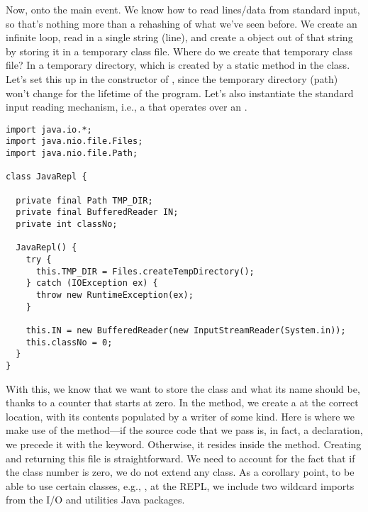 Now, onto the main event. We know how to read lines/data from standard input, so that's nothing more than a rehashing of what we've seen before. We create an infinite loop, read in a single string (line), and create a  object out of that string by storing it in a temporary class file. Where do we create that temporary class file? In a temporary directory, which is created by a static method in the class. Let's set this up in the constructor of , since the temporary directory (path) won't change for the lifetime of the program. Let's also instantiate the standard input reading mechanism, i.e., a  that operates over an .

\begin{lstlisting}[language=MyJava]
import java.io.*;
import java.nio.file.Files;
import java.nio.file.Path;

class JavaRepl {

  private final Path TMP_DIR;
  private final BufferedReader IN; 
  private int classNo;

  JavaRepl() {
    try {
      this.TMP_DIR = Files.createTempDirectory();
    } catch (IOException ex) {
      throw new RuntimeException(ex);
    } 
    
    this.IN = new BufferedReader(new InputStreamReader(System.in));
    this.classNo = 0;
  }
}
\end{lstlisting}

With this, we know that we want to store the class and what its name should be, thanks to a counter that starts at zero. In the  method, we create a  at the correct location, with its contents populated by a writer of some kind. Here is where we make use of the  method---if the source code that we pass is, in fact, a declaration, we precede it with the  keyword. Otherwise, it resides inside the  method. Creating and returning this file is straightforward. We need to account for the fact that if the class number is zero, we do not extend any class. As a corollary point, to be able to use certain classes, e.g., , at the REPL, we include two wildcard imports from the I/O and utilities Java packages.

